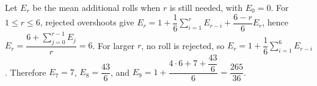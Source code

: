 Let $E_r$ be the mean additional rolls when $r$ is still needed, with $E_0=0$. For $1\le r\le6$, rejected overshoots give $E_r=1+\dfrac{1}{6}\sum_{i=1}^rE_{r-i}+\dfrac{6-r}{6}E_r$, hence $E_r=\dfrac{6+\sum_{j=0}^{r-1}E_j}{r}=6$. For larger $r$, no roll is rejected, so $E_r=1+\dfrac{1}{6}\sum_{i=1}^6E_{r-i}$. Therefore $E_7=7$, $E_8=\dfrac{43}{6}$, and $E_9=1+\dfrac{4\cdot6+7+\dfrac{43}{6}}{6}=\boxed{\dfrac{265}{36}}$.
